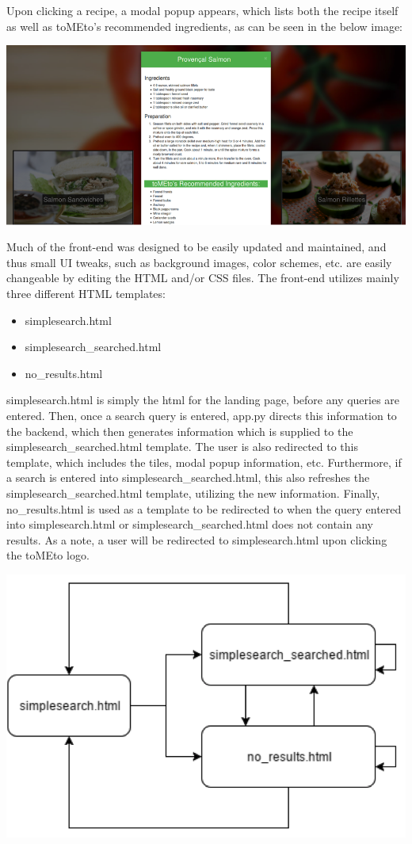 \documentclass{acm_proc_article-sp}
\begin{document}
Upon clicking a recipe, a modal popup appears, which lists both the recipe itself as well as toMEto's recommended ingredients, as can be seen in the below image:

\includegraphics[scale=0.5]{p3.png}

Much of the front-end was designed to be easily updated and maintained, and thus small UI tweaks, such as background images, color schemes, etc. are easily changeable by editing the HTML and/or CSS files. The front-end utilizes mainly three different HTML templates:\begin{itemize}
\item simplesearch.html 
\item simplesearch\_searched.html 
\item no\_results.html
\end{itemize}

simplesearch.html is simply the html for the landing page, before any queries are entered. Then, once a search query is entered, app.py directs this information to the backend, which then generates information which is supplied to the simplesearch\_searched.html template. The user is also redirected to this template, which includes the tiles, modal popup information, etc. Furthermore, if a search is entered into simplesearch\_searched.html, this also refreshes the simplesearch\_searched.html template, utilizing the new information. Finally, no\_results.html is used as a template to be redirected to when the query entered into simplesearch.html or simplesearch\_searched.html does not contain any results. As a note, a user will be redirected to simplesearch.html upon clicking the toMEto logo.

\includegraphics[scale=0.5]{p4.png}
\end{document}
